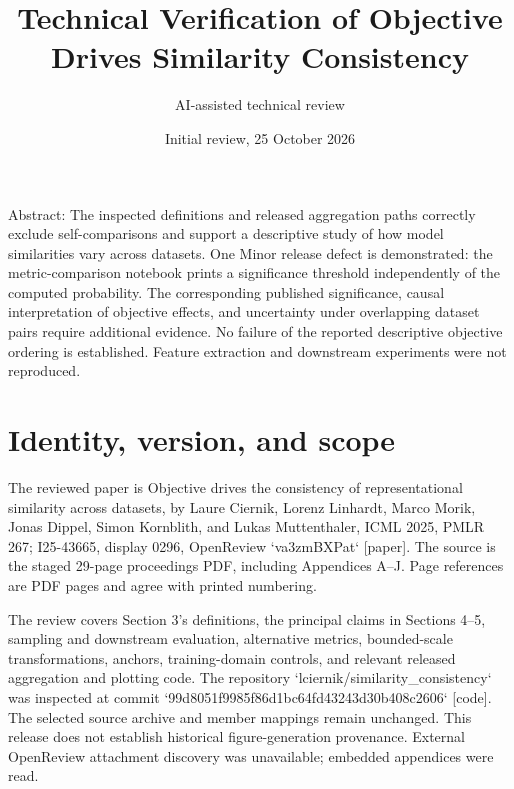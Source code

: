 \documentclass[10pt]{article}
\title{Technical Verification of
Objective Drives Similarity Consistency}
\author{AI-assisted technical review}
\date{Initial review, 25 October 2026}
\begin{document}
\maketitle
Abstract: The inspected definitions and released aggregation paths correctly exclude self-comparisons and support a descriptive study of how model similarities vary across datasets. One Minor release defect is demonstrated: the metric-comparison notebook prints a significance threshold independently of the computed probability. The corresponding published significance, causal interpretation of objective effects, and uncertainty under overlapping dataset pairs require additional evidence. No failure of the reported descriptive objective ordering is established. Feature extraction and downstream experiments were not reproduced.\par
\section*{Identity, version, and scope}
The reviewed paper is Objective drives the consistency of representational similarity across datasets, by Laure Ciernik, Lorenz Linhardt, Marco Morik, Jonas Dippel, Simon Kornblith, and Lukas Muttenthaler, ICML 2025, PMLR 267; I25-43665, display 0296, OpenReview `va3zmBXPat` [paper]. The source is the staged 29-page proceedings PDF, including Appendices A–J. Page references are PDF pages and agree with printed numbering.\par
The review covers Section 3’s definitions, the principal claims in Sections 4–5, sampling and downstream evaluation, alternative metrics, bounded-scale transformations, anchors, training-domain controls, and relevant released aggregation and plotting code. The repository `lciernik/similarity\_consistency` was inspected at commit `99d8051f9985f86d1bc64fd43243d30b408c2606` [code]. The selected source archive and member mappings remain unchanged. This release does not establish historical figure-generation provenance. External OpenReview attachment discovery was unavailable; embedded appendices were read.\par
\end{document}
